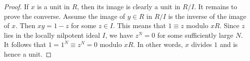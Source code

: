 \documentclass[10pt,a4paper]{amsart}
\theoremstyle{plain}
\theoremstyle{definition}
\theoremstyle{remark}
\numberwithin{equation}{subsection}
\begin{document}
\begin{proof}
If $x$ is a unit in $R$, then its image is clearly a unit in $R/I$.
It remains to prove the converse.
Assume the image of $y \in R$ in $R/I$ is the inverse of the image of $x$.
Then $xy = 1 - z$ for some $z \in I$.
This means that $1\equiv z$ modulo $xR$.
Since $z$ lies in the locally nilpotent ideal
$I$, we have $z^N = 0$ for some sufficiently large $N$.
It follows that $1 = 1^N \equiv z^N = 0$ modulo $xR$.
In other words, $x$ divides $1$ and is hence a unit.
\end{proof}
\end{document}
